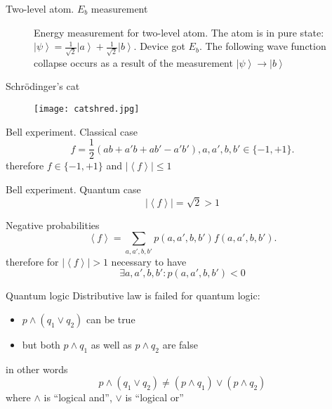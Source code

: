 \documentclass[10pt,pdf,hyperref={unicode}]{beamer}
\begin{document}
\begin{frame}{Two-level atom. $E_b$ measurement}
\begin{figure}
\centering



\caption{Energy measurement for two-level atom. The atom is in pure
  state: $\left|\psi\right> = 
\frac{1}{\sqrt{2}}\left|a\right> + \frac{1}{\sqrt{2}}\left|b\right>$.
Device got $E_b$. The following wave function collapse occurs as a
  result of the measurement $\left|\psi\right> \to \left|b\right>$
}
\label{fig:add:mesure_ex_b}
\end{figure}
\end{frame}

\begin{frame}{Schrödinger's cat}
 \begin{figure} 
   \texttt{[image: catshred.jpg]}
  \end{figure}
\end{frame}

\begin{frame}{Bell experiment. Classical case}
\[
f = \frac{1}{2}\left(
a b + a' b + a b' - a' b'
\right), a,a',b,b' \in \{-1, +1\}.
\]
therefore
\(
f \in \{-1, +1\}
\)
and
\(
\left|\left<f\right>\right| \le 1
\)
\end{frame}

\begin{frame}{Bell experiment. Quantum case}
\[
\left|\left<f\right>\right| = \sqrt{2} > 1
\]
\end{frame}


\begin{frame}{Negative probabilities}
\[
\left<f\right> = \sum_{a,a',b,b'} p(a,a',b,b') f(a,a',b,b').
\]
therefore for $\left|\left<f\right>\right| > 1$ necessary to have
\[
\exists a,a',b,b': p(a,a',b,b') < 0
\]
\end{frame}

\begin{frame}{Quantum logic}
  Distributive law is failed for quantum logic:
  \begin{itemize}
  \item $p \land (q_1 \lor q_2)$ can be true
  \item but both $p \land q_1$ as well as $p \land q_2$ are false
  \end{itemize}
  in other words
  \[
  p \land (q_1 \lor q_2) \ne (p \land q_1) \lor (p \land q_2)
  \]
  where $\land$ is ``logical and'', $\lor$ is ``logical or''
\end{frame}
\end{document}
